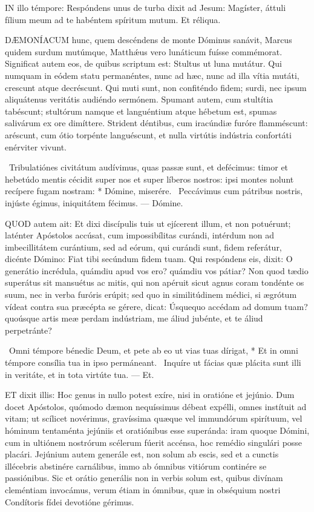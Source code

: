 \lettrine[lines=2]{I}{N} illo témpore: Respóndens unus de turba dixit ad Jesum: Magíster, áttuli fílium meum ad te habéntem spíritum mutum. Et réliqua.



\lettrine[lines=2]{D}{ÆMONÍACUM} hunc, quem descéndens de monte Dóminus sanávit, Marcus quidem surdum mutúmque, Matthǽus vero lunáticum fuísse commémorat. Significat autem eos, de quibus scriptum est: Stultus ut luna mutátur. Qui numquam in eódem statu permanéntes, nunc ad hæc, nunc ad illa vítia mutáti, crescunt atque decréscunt. Qui muti sunt, non confiténdo fidem; surdi, nec ipsum aliquátenus veritátis audiéndo sermónem. Spumant autem, cum stultítia tabéscunt; stultórum namque et languéntium atque hébetum est, spumas salivárum ex ore dimíttere. Strident déntibus, cum iracúndiæ furóre flamméscunt: aréscunt, cum ótio torpénte languéscunt, et nulla virtútis indústria confortáti enérviter vivunt.

\R\ Tribulatiónes civitátum audívimus, quas passæ sunt, et defécimus: timor et hebetúdo mentis cécidit super nos et super líberos nostros: ipsi montes nolunt recípere fugam nostram: * Dómine, miserére. \V\ Peccávimus cum pátribus nostris, injúste égimus, iniquitátem fécimus. — Dómine.


\lettrine[lines=2]{Q}{UOD} autem ait: Et dixi discípulis tuis ut ejícerent illum, et non potuérunt; laténter Apóstolos accúsat, cum impossibílitas curándi, intérdum non ad imbecillitátem curántium, sed ad eórum, qui curándi sunt, fidem referátur, dicénte Dómino: Fiat tibi secúndum fidem tuam. Qui respóndens eis, dixit: O generátio incrédula, quámdiu apud vos ero? quámdiu vos pátiar? Non quod tædio superátus sit mansuétus ac mitis, qui non apéruit sicut agnus coram tondénte os suum, nec in verba furóris erúpit; sed quo in similitúdinem médici, si ægrótum vídeat contra sua præcépta se gérere, dicat: Úsquequo accédam ad domum tuam? quoúsque artis meæ perdam indústriam, me áliud jubénte, et te áliud perpetránte?

\R\ Omni témpore bénedic Deum, et pete ab eo ut vias tuas dírigat, * Et in omni témpore consília tua in ipso permáneant. \V\ Inquíre ut fácias quæ plácita sunt illi in veritáte, et in tota virtúte tua. — Et.


\lettrine[lines=2]{E}{T} dixit illis: Hoc genus in nullo potest exíre, nisi in oratióne et jejúnio. Dum docet Apóstolos, quómodo dæmon nequíssimus débeat expélli, omnes instítuit ad vitam; ut scílicet novérimus, gravíssima quæque vel immundórum spirítuum, vel hóminum tentaménta jejúniis et oratiónibus esse superánda: iram quoque Dómini, cum in ultiónem nostrórum scélerum fúerit accénsa, hoc remédio singulári posse placári. Jejúnium autem generále est, non solum ab escis, sed et a cunctis illécebris abstinére carnálibus, immo ab ómnibus vitiórum continére se passiónibus. Sic et orátio generális non in verbis solum est, quibus divínam cleméntiam invocámus, verum étiam in ómnibus, quæ in obséquium nostri Condítoris fídei devotióne gérimus.

